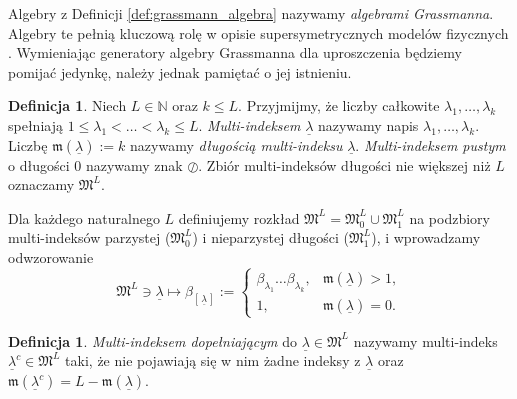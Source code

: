 \documentclass[11pt,a4paper]{report}
\theoremstyle{definition}
\newtheorem{definition}[theorem]{Definicja}
\begin{document}
Algebry z Definicji \ref{def:grassmann_algebra} nazywamy \textit{algebrami Grassmanna}. Algebry te pełnią kluczową rolę w opisie supersymetrycznych modelów fizycznych \cite{rogers}. Wymieniając generatory algebry Grassmanna dla uproszczenia będziemy pomijać jedynkę, należy jednak pamiętać o jej istnieniu.
\begin{definition}
	Niech $L \in \mathbb{N}$ oraz $k \leq L$. Przyjmijmy, że liczby całkowite $\lambda_1, \ldots, \lambda_k$ spełniają $1 \leq \lambda_1 < \ldots < \lambda_k \leq L$. \textit{Multi-indeksem} $\underline{\lambda}$ nazywamy napis $\lambda_1, \ldots, \lambda_k$. Liczbę $\mathfrak{m}\! \left( \underline{\lambda} \right) := k$ nazywamy \textit{długością multi-indeksu} $\underline{\lambda}$. \textit{Multi-indeksem pustym} o długości 0 nazywamy znak $\oslash$. Zbiór multi-indeksów długości nie większej niż $L$ oznaczamy $\mathfrak{M}^L$.
	\label{mindex}
\end{definition}
Dla każdego naturalnego $L$ definiujemy rozkład $\mathfrak{M}^L = \mathfrak{M}^L_0 \cup \mathfrak{M}^L_1$ na podzbiory multi-indeksów parzystej ($\mathfrak{M}^L_{0}$) i nieparzystej długości ($\mathfrak{M}^L_{1}$), i wprowadzamy odwzorowanie
\begin{equation*}
	\mathfrak{M}^L \ni \underline{\lambda} \mapsto \beta_{\left[\, \underline{\lambda}\, \right]} := \left\{ \begin{array}{lr}
	\beta_{\lambda_1} \ldots \beta_{\lambda_k}, & \mathfrak{m}(\underline{\lambda}) > 1, \\
	1, & \mathfrak{m}(\underline{\lambda}) = 0.  
	\end{array} \right.
\end{equation*}

\begin{definition}
	\textit{Multi-indeksem dopełniającym} do $\underline{\lambda} \in \mathfrak{M}^L$ nazywamy multi-indeks $\underline{\lambda}^c \in \mathfrak{M}^L$ taki, że nie pojawiają się w nim żadne indeksy z $\underline{\lambda}$ oraz $\mathfrak{m}(\underline{\lambda}^c) = L - \mathfrak{m}(\underline{\lambda})$.
\end{definition}
\end{document}
